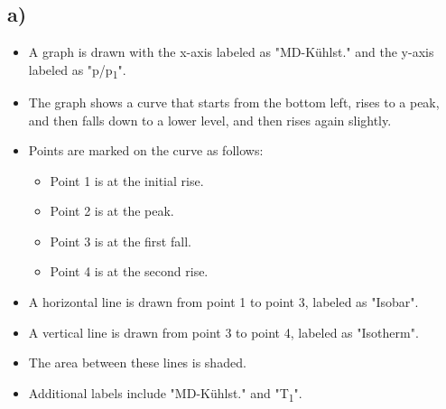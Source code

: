 

\subsection*{a)}

\begin{itemize}
    \item A graph is drawn with the x-axis labeled as "MD-Kühlst." and the y-axis labeled as "p/p\textsubscript{1}". 
    \item The graph shows a curve that starts from the bottom left, rises to a peak, and then falls down to a lower level, and then rises again slightly.
    \item Points are marked on the curve as follows:
        \begin{itemize}
            \item Point 1 is at the initial rise.
            \item Point 2 is at the peak.
            \item Point 3 is at the first fall.
            \item Point 4 is at the second rise.
        \end{itemize}
    \item A horizontal line is drawn from point 1 to point 3, labeled as "Isobar".
    \item A vertical line is drawn from point 3 to point 4, labeled as "Isotherm".
    \item The area between these lines is shaded.
    \item Additional labels include "MD-Kühlst." and "T\textsubscript{1}".
\end{itemize}